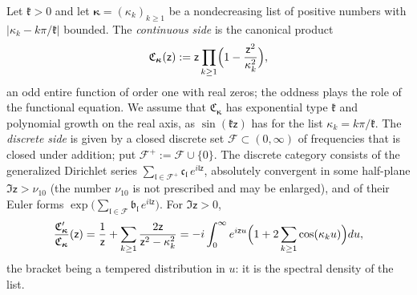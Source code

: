 \documentclass[11pt,reqno]{amsart}
\numberwithin{equation}{section}
\theoremstyle{plain}
\theoremstyle{definition}
\theoremstyle{remark}
\begin{document}
Let $\mathfrak k>0$ and let $\boldsymbol{\kappa}=(\kappa_k)_{k\ge1}$ be a nondecreasing list of positive numbers with $|\kappa_k-k\pi/\mathfrak k|$ bounded.  The \emph{continuous side} is the canonical product
\begin{equation}\label{eq:model-product}
 \mathfrak C_{\boldsymbol{\kappa}}(\mathsf z):=\mathsf z\prod_{k\ge1}\Bigl(1-\frac{\mathsf z^2}{\kappa_k^2}\Bigr),
\end{equation}
an odd entire function of order one with real zeros; the oddness plays the role of the functional equation.  We assume that $\mathfrak C_{\boldsymbol{\kappa}}$ has exponential type $\mathfrak k$ and polynomial growth on the real axis, as $\sin(\mathfrak k\mathsf z)$ has for the list $\kappa_k=k\pi/\mathfrak k$.  The \emph{discrete side} is given by a closed discrete set $\mathscr F\subset(0,\infty)$ of frequencies that is closed under addition; put $\mathscr F^{+}:=\mathscr F\cup\{0\}$.  The discrete category consists of the generalized Dirichlet series $\sum_{\mathfrak l\in\mathscr F^{+}}\mathfrak c_{\mathfrak l}\,e^{i\mathfrak l\mathsf z}$, absolutely convergent in some half-plane $\Im\mathsf z>\nu_{10}$ (the number $\nu_{10}$ is not prescribed and may be enlarged), and of their Euler forms $\exp\bigl(\sum_{\mathfrak l\in\mathscr F}\mathfrak b_{\mathfrak l}\,e^{i\mathfrak l\mathsf z}\bigr)$.  For $\Im\mathsf z>0$,
\begin{equation}\label{eq:model-logder}
 \frac{\mathfrak C_{\boldsymbol{\kappa}}'}{\mathfrak C_{\boldsymbol{\kappa}}}(\mathsf z)=\frac1{\mathsf z}+\sum_{k\ge1}\frac{2\mathsf z}{\mathsf z^2-\kappa_k^2}=-i\int_0^\infty e^{i\mathsf zu}\Bigl(1+2\sum_{k\ge1}\cos(\kappa_ku)\Bigr)du ,
\end{equation}
the bracket being a tempered distribution in $u$: it is the spectral density of the list.
\end{document}
